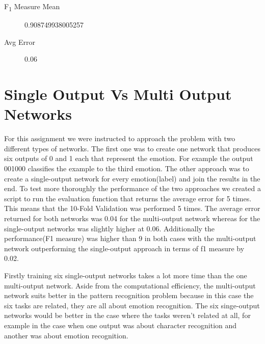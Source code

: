 \documentclass[a4paper,11pt]{article}
\begin{document}
\begin{description}
	\item[F\textsubscript{1} Measure Mean] 0.908749938005257
	\item[Avg Error] 0.06
\end{description}


\section{Single Output Vs Multi Output Networks}
For this assignment we were instructed to approach the problem with two different types of networks. The first one was to create one network that produces six outputs of 0 and 1 each that represent the emotion. For example the output 001000 classifies the example to the third emotion. The other approach was to create a single-output network for every emotion(label) and join the results in the end.
To test more thoroughly the performance of the two approaches we created a script to run the evaluation function that returns the average error for 5 times. This means that the 10-Fold Validation was performed 5 times. The average error returned for both networks was 0.04 for the multi-output network whereas for the single-output networks was slightly higher at 0.06. Additionally the performance(F1 measure) was higher than 9 in both cases with the multi-output network outperforming the single-output approach in terms of f1 measure by 0.02.

Firstly training six single-output networks takes a lot more time than the one multi-output network. Aside from the computational efficiency, the multi-output network suits better in the pattern recognition problem because in this case the six tasks are related, they are all about emotion recognition. The six singe-output networks would be better in the case where the tasks weren’t related at all, for example in the case when one output was about character recognition and another was about emotion recognition.
\end{document}
